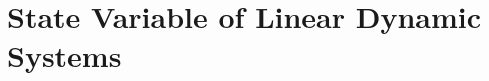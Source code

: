 \documentclass[../course]{subfiles}
\begin{document}
\chapter{State Variable of Linear Dynamic Systems}


\end{document}
